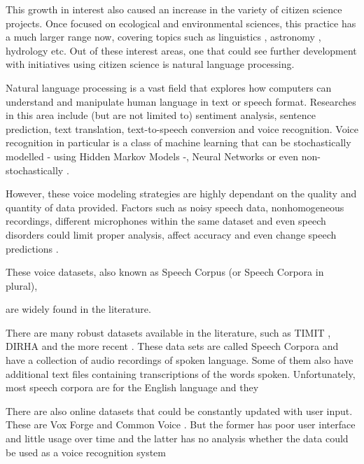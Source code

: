 This growth in interest also caused an increase in the variety of citizen science projects. Once focused on ecological and environmental sciences, this practice has a much larger range now, covering topics such as linguistics \cite{svendsen2018dynamics}, astronomy \cite{marshall2015ideas}, hydrology \cite{buytaert2014citizen} etc.
Out of these interest areas, one that could see further development with initiatives using citizen science is natural language processing.

Natural language processing is a vast field that explores how computers can understand and manipulate human language in text or speech format. Researches in this area include (but are not limited to) sentiment analysis, sentence prediction, text translation, text-to-speech conversion and voice recognition. Voice recognition in particular is a class of machine learning that can be stochastically modelled - using Hidden Markov Models \cite{gales2008application} -, Neural Networks \cite{graves2013speech} or even non-stochastically \cite{burget2003nonrandomattr}.

However, these voice modeling strategies are highly dependant on the quality and quantity of data provided. Factors such as noisy speech data, nonhomogeneous recordings, different microphones within the same dataset and even speech disorders could limit proper analysis, affect accuracy and even change speech predictions \cite{}. 

These voice datasets, also known as Speech Corpus (or Speech Corpora in plural), 

are widely found in the literature. 

There are many robust datasets available in the literature, such as TIMIT \cite{Lamel1992timmit}, DIRHA \cite{Ravanelli2016dirha} and the more recent \cite{chanchaochai2018globaltimit}. These data sets are called Speech Corpora and have a collection of audio recordings of spoken language. Some of them also have additional text files containing transcriptions of the words spoken. Unfortunately, most speech corpora are for the English language \cite{LeRouxVincent2014TRdatasets} and they 

There are also online datasets that could be constantly updated with user input. These are Vox Forge \cite{asd} and Common Voice \cite{mozilla}. But the former has poor user interface and little usage over time and the latter has no analysis whether the data could be used as a voice recognition system

